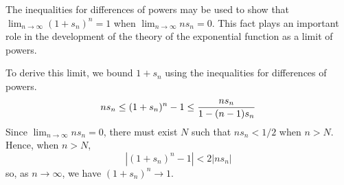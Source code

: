 \documentclass[12pt]{article}
\begin{document}
The inequalities for differences of powers may be used to show that
$\lim_{n \to \infty} (1 + s_n)^n = 1$ when $\lim_{n \to \infty} n s_n = 0$.
This fact plays an important role in the development of the theory of the 
exponential function as a limit of powers.

To derive this limit, we bound $1 + s_n$ using the inequalities for differences
of powers.  
\[ n s_n \le (1 + s_n)^n - 1 \le {n s_n \over 1 - (n-1) s_n} \]
Since $\lim_{n \to \infty} n s_n = 0$, there must exist $N$ such that $n s_n < 
1/2$ when $n > N$.  Hence, when $n > N$,
\[ | (1 + s_n)^n - 1 | < 2 |n s_n| \]
so, as $n \to \infty$, we have $(1 + s_n)^n \to 1$.
\end{document}
